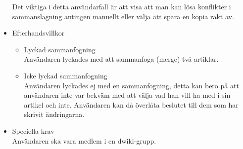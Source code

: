 \begin{itemize}
	Det viktiga i detta användarfall är att visa att man kan lösa konflikter i sammanslagning antingen manuellt eller välja att spara en kopia rakt av.
	\item Efterhandsvillkor
		\begin{itemize}	
		\item Lyckad sammanfogning
		\\Användaren lyckades med att sammanfoga (merge) två artiklar.
		\item Icke lyckad sammanfogning
		\\Användaren lyckades ej med en sammanfogning, detta kan bero på att användaren inte var bekväm med att välja vad han vill ha med i sin artikel och inte. Användaren kan då överlåta beslutet till dem som har skrivit ändringarna.
		\end{itemize}
	\item Speciella krav
	\\Användaren ska vara medlem i en dwiki-grupp.
\end{itemize}

